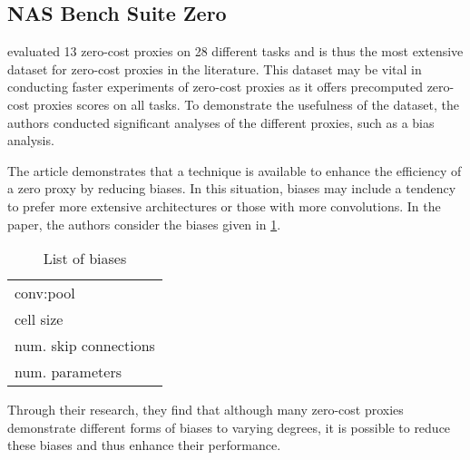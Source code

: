 \subsection{NAS Bench Suite Zero}
\cite{krishnakumar2022bench} evaluated 13 zero-cost proxies on 28 different tasks and is thus the most extensive dataset for zero-cost proxies in the literature. This dataset may be vital in conducting faster experiments of zero-cost proxies as it offers precomputed zero-cost proxies scores on all tasks. To demonstrate the usefulness of the dataset, the authors conducted significant analyses of the different proxies, such as a bias analysis. 

The article demonstrates that a technique is available to enhance the efficiency of a zero proxy by reducing biases. In this situation, biases may include a tendency to prefer more extensive architectures or those with more convolutions. In the paper, the authors consider the biases given in \cref{tab:biases}. 

\begin{table}[ht]
\caption{List of biases}
\centering
\begin{tabular}{|l}
conv:pool\\
\cellcolor{verylightgray}cell size    \\
num. skip connections\\
\cellcolor{verylightgray}num. parameters              
\end{tabular}
\label{tab:biases}
\end{table}

Through their research, they find that although many zero-cost proxies demonstrate different forms of biases to varying degrees, it is possible to reduce these biases and thus enhance their performance.